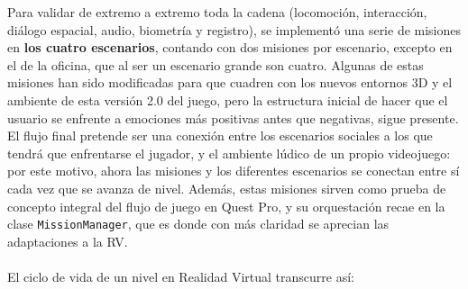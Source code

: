 \documentclass[12pt,twoside,titlepage]{report}
\begin{document}
Para validar de extremo a extremo toda la cadena (locomoción, interacción, diálogo espacial, audio, biometría y registro), se implementó una serie de misiones en \textbf{los cuatro escenarios}, contando con dos misiones por escenario, excepto en el de la oficina, que al ser un escenario grande son cuatro.
Algunas de estas misiones han sido modificadas para que cuadren con los nuevos entornos 3D y el ambiente de esta versión 2.0 del juego, pero la estructura inicial de hacer que el usuario se enfrente a emociones más positivas antes que negativas, sigue presente.
El flujo final pretende ser una conexión entre los escenarios sociales a los que tendrá que enfrentarse el jugador, y el ambiente lúdico de un propio videojuego: por este motivo, ahora las misiones y los diferentes escenarios se conectan entre sí cada vez que se avanza de nivel.
Además, estas misiones sirven como prueba de concepto integral del flujo de juego en Quest Pro, y su orquestación recae en la clase \texttt{MissionManager}, que es donde con más claridad se aprecian las adaptaciones a la RV.\\
\\
El ciclo de vida de un nivel en Realidad Virtual transcurre así:
\end{document}
